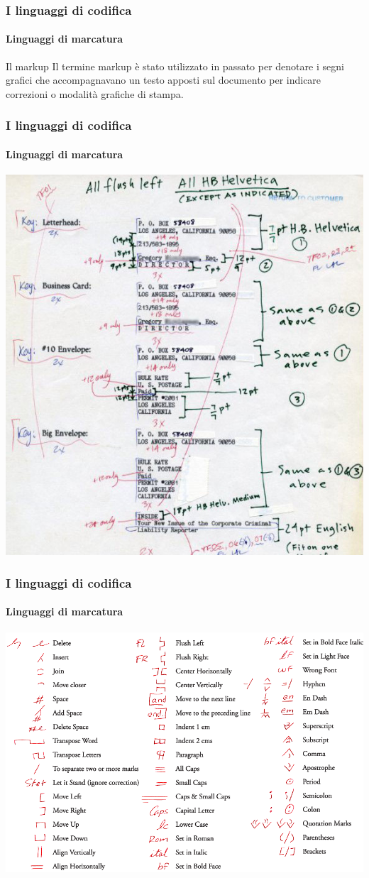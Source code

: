 \documentclass{beamer}
\begin{document}
\begin{frame}
	\frametitle{I linguaggi di codifica}
	\framesubtitle{Linguaggi di marcatura}
	\addtocounter{nframe}{1}

	\begin{block}{Il markup}
		Il termine markup è stato utilizzato in passato per denotare i segni grafici che accompagnavano un testo apposti sul documento per indicare correzioni o modalità grafiche di stampa.
	\end{block}

\end{frame}

\begin{frame}
	\frametitle{I linguaggi di codifica}
	\framesubtitle{Linguaggi di marcatura}
	\addtocounter{nframe}{1}

	\begin{center}
		\includegraphics[width=.7\textwidth]{imgs/markup001.jpg}
	\end{center}

\end{frame}

\begin{frame}
	\frametitle{I linguaggi di codifica}
	\framesubtitle{Linguaggi di marcatura}
	\addtocounter{nframe}{1}

	\begin{center}
		\includegraphics[width=.8\textwidth]{imgs/MarkupConvention.png}
	\end{center}

\end{frame}
\end{document}
